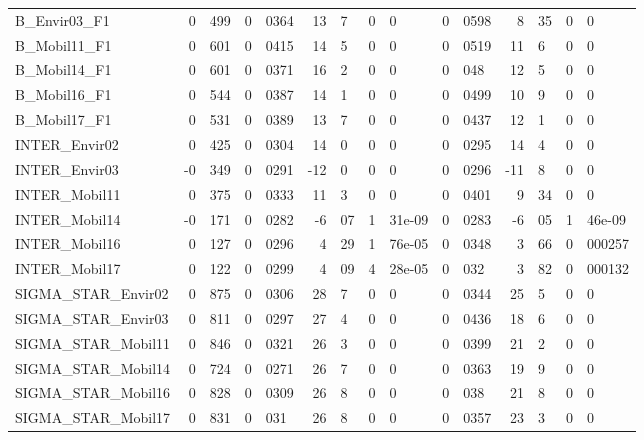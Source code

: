 \documentclass[12pt,a4paper]{article}
\begin{document}
\begin{sidewaystable}[htb]
\begin{tabular}{lr@{.}lr@{.}lr@{.}lr@{.}lr@{.}lr@{.}lr@{.}l}
B\_Envir03\_F1               &   0&499 &   0&0364 &    13&7 &      0&0 &        0&0598 &         8&35 &           0&0 \\
B\_Mobil11\_F1               &   0&601 &   0&0415 &    14&5 &      0&0 &        0&0519 &         11&6 &           0&0 \\
B\_Mobil14\_F1               &   0&601 &   0&0371 &    16&2 &      0&0 &         0&048 &         12&5 &           0&0 \\
B\_Mobil16\_F1               &   0&544 &   0&0387 &    14&1 &      0&0 &        0&0499 &         10&9 &           0&0 \\
B\_Mobil17\_F1               &   0&531 &   0&0389 &    13&7 &      0&0 &        0&0437 &         12&1 &           0&0 \\
INTER\_Envir02              &   0&425 &   0&0304 &    14&0 &      0&0 &        0&0295 &         14&4 &           0&0 \\
INTER\_Envir03              &  -0&349 &   0&0291 &   -12&0 &      0&0 &        0&0296 &        -11&8 &           0&0 \\
INTER\_Mobil11              &   0&375 &   0&0333 &    11&3 &      0&0 &        0&0401 &         9&34 &           0&0 \\
INTER\_Mobil14              &  -0&171 &   0&0282 &   -6&07 & 1&31e-09 &        0&0283 &        -6&05 &      1&46e-09 \\
INTER\_Mobil16              &   0&127 &   0&0296 &    4&29 & 1&76e-05 &        0&0348 &         3&66 &      0&000257 \\
INTER\_Mobil17              &   0&122 &   0&0299 &    4&09 & 4&28e-05 &         0&032 &         3&82 &      0&000132 \\
SIGMA\_STAR\_Envir02         &   0&875 &   0&0306 &    28&7 &      0&0 &        0&0344 &         25&5 &           0&0 \\
SIGMA\_STAR\_Envir03         &   0&811 &   0&0297 &    27&4 &      0&0 &        0&0436 &         18&6 &           0&0 \\
SIGMA\_STAR\_Mobil11         &   0&846 &   0&0321 &    26&3 &      0&0 &        0&0399 &         21&2 &           0&0 \\
SIGMA\_STAR\_Mobil14         &   0&724 &   0&0271 &    26&7 &      0&0 &        0&0363 &         19&9 &           0&0 \\
SIGMA\_STAR\_Mobil16         &   0&828 &   0&0309 &    26&8 &      0&0 &         0&038 &         21&8 &           0&0 \\
SIGMA\_STAR\_Mobil17         &   0&831 &    0&031 &    26&8 &      0&0 &        0&0357 &         23&3 &           0&0 \\
\hline
\end{tabular}
 \end{sidewaystable}
\end{document}
